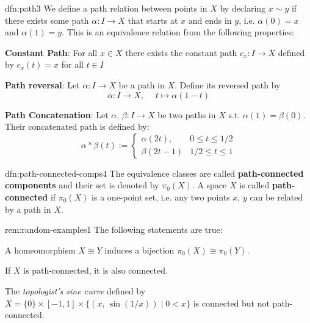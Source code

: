 \documentclass[landscape, 8pt]{extarticle}
\begin{document}
\begin{multicols*}{3}
\begin{dfn}[Path]{dfn:path}{3}
	We define a path relation between points in $X$ by declaring $x \sim y$ if there exists some path $\alpha : I \to X$ that starts at $x$ and ends in $y$, i.e. $\alpha(0) = x$ and $\alpha(1) = y$. This is an equivalence relation from the following properties:
	\begin{enumerate-zero}
	    \item \textbf{Constant Path}: For all $x\in X$ there exists the constant path $c_{x} : I \to X$ defined by $c_{x}(t)=x$ for all $t\in I$
	    \item \textbf{Path reversal}: Let $\alpha : I \to X$ be a path in $X$. Define its reversed path by
			\begin{equation}\label{eq:path-reversal}
				\overline{\alpha} : I \to X,\;\quad t \mapsto \alpha(1-t)
			\end{equation}
		\item \textbf{Path Concatenation}: Let $\alpha,\,\beta : I \to X$ be two paths in $X$ s.t. $\alpha(1) = \beta(0)$. Their concatenated path is defined by:
			\begin{equation}
				\alpha \ast \beta(t) := \begin{cases}
					\alpha(2t), &0 \le t\le 1 /2\\
					\beta(2t-1) & 1 /2 \le t \le 1
				\end{cases}
			\end{equation}
	\end{enumerate-zero}
\end{dfn}

\vspace{-7pt}
\begin{dfn}{dfn:path-connected-comps}{4}
	The equivalence classes are called \textbf{path-connected components} and their set is denoted by $\pi_{0}(X)$. A space $X$ is called \textbf{path-connected} if $\pi_{0}(X)$ is a one-point set, i.e. any two points $x,\,y$ can be related by a path in $X$.
\end{dfn}

\vspace{-7pt}
\begin{rem}{rem:random-examples}{1}
	The following statements are true:
	\begin{itemize-zero}
	    \item A homeomorphism $X \cong Y$ induces a bijection $\pi_{0}(X) \cong \pi_{0}(Y)$.
	    \item If $X$ is path-connected, it is also connected.
	    \item The \textit{topologist's sine curve} defined by $X = \{0\} \times [-1,1] \times \{(x,\,\sin(1 /x)) \mid 0 < x\}$ is connected but not path-connected.
	\end{itemize-zero}
\end{rem}


\end{multicols*}
\end{document}
